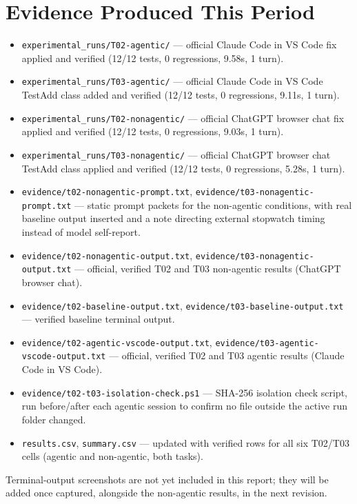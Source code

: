 \documentclass[12pt]{article}
\newcommand{\AgentName}{Claude Code in VS Code}
\newcommand{\LLMName}{ChatGPT browser chat}
\begin{document}
\section{Evidence Produced This Period}

\begin{itemize}
    \item \texttt{experimental\_runs/T02-agentic/} --- official \AgentName{}
    fix applied and verified (12/12 tests, 0 regressions, 9.58s, 1 turn).
    \item \texttt{experimental\_runs/T03-agentic/} --- official \AgentName{}
    TestAdd class added and verified (12/12 tests, 0 regressions, 9.11s,
    1 turn).
    \item \texttt{experimental\_runs/T02-nonagentic/} --- official \LLMName{}
    fix applied and verified (12/12 tests, 0 regressions, 9.03s, 1 turn).
    \item \texttt{experimental\_runs/T03-nonagentic/} --- official \LLMName{}
    TestAdd class applied and verified (12/12 tests, 0 regressions, 5.28s,
    1 turn).
    \item \texttt{evidence/t02-nonagentic-prompt.txt},
    \texttt{evidence/t03-nonagentic-prompt.txt} --- static prompt packets for
    the non-agentic conditions, with real baseline output inserted and a note
    directing external stopwatch timing instead of model self-report.
    \item \texttt{evidence/t02-nonagentic-output.txt},
    \texttt{evidence/t03-nonagentic-output.txt} --- official, verified T02 and
    T03 non-agentic results (\LLMName).
    \item \texttt{evidence/t02-baseline-output.txt},
    \texttt{evidence/t03-baseline-output.txt} --- verified baseline terminal
    output.
    \item \small\texttt{evidence/t02-agentic-vscode-output.txt},
    \texttt{evidence/t03-agentic-vscode-output.txt}\normalsize{} --- official,
    verified T02 and T03 agentic results (\AgentName).
    \item \texttt{evidence/t02-t03-isolation-check.ps1} --- SHA-256 isolation
    check script, run before/after each agentic session to confirm no file
    outside the active run folder changed.
    \item \texttt{results.csv}, \texttt{summary.csv} --- updated with verified
    rows for all six T02/T03 cells (agentic and non-agentic, both tasks).
\end{itemize}

Terminal-output screenshots are not yet included in this report; they will be
added once captured, alongside the non-agentic results, in the next revision.
\end{document}
